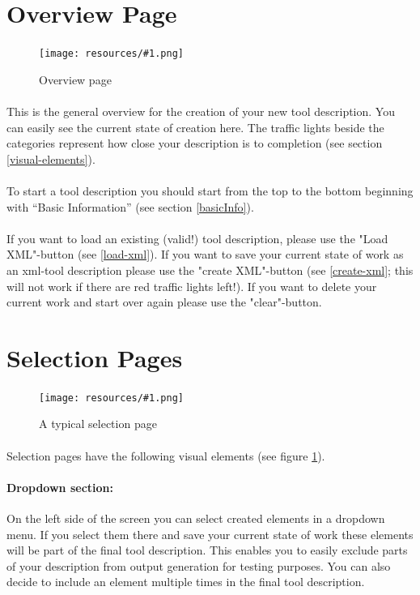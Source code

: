 \documentclass[a4paper,10pt]{book}
\newcommand{\bigpic}[1]{\texttt{[image: resources/\#1.png]}}
\begin{document}
\section{Overview Page}
\label{layout-overview}

\begin{figure}
 \bigpic{overview}
 \caption{Overview page}
\end{figure}

\paragraph{} This is the general overview for the creation of your new tool description.
You can easily see the current state of creation here. The traffic lights beside the categories represent how close your description is to completion (see section \ref{visual-elements}).
\paragraph{} To start a tool description you should start from the top to the bottom beginning with ``Basic Information'' (see section \ref{basicInfo}).
\paragraph{} If you want to load an existing (valid!) tool description, please use the "Load XML"-button (see \ref{load-xml}). If you want to save your current state of work as an xml-tool description please use the "create XML"-button (see \ref{create-xml}; this will not work if there are red traffic lights left!). If you want to delete your current work and start over again please use the "clear"-button.

\section{Selection Pages}
\label{layout-selectionPages}

\begin{figure}
 \bigpic{selectionPage}
 \caption{A typical selection page}
\label{layout-selectionPage}
\end{figure}

\paragraph{} Selection pages have the following visual elements (see figure \ref{layout-selectionPage}).
\paragraph{Dropdown section:} On the left side of the screen you can select created elements in a dropdown menu. If you select them there and save your current state of work these elements will be part of the final tool description. This enables you to easily exclude parts of your description from output generation for testing purposes. You can also decide to include an element multiple times in the final tool description.
\end{document}
